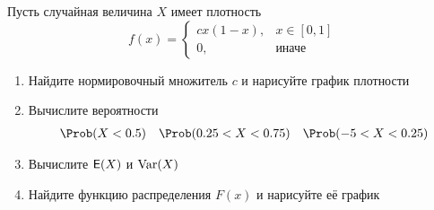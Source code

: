 \begin{exercise}
Пусть случайная величина \(X\) имеет плотность
\[
	f(x)=\begin{cases}
	cx(1-x), & x\in[0,1] \\ 0, & \text{иначе}
	\end{cases}
\]
\begin{enumerate}
	\item Найдите нормировочный множитель \(c\) и нарисуйте график плотности
	\item Вычислите вероятности
	\begin{align*}
		\Prob&(X<0.5) & \Prob&(0.25<X<0.75) & \Prob(-5<X<0.25)
	\end{align*}
	\item Вычислите \({\mathsf E}(X)\) и \(\operatorname{Var}(X)\)
	\item Найдите функцию распределения \(F(x)\) и нарисуйте её график
\end{enumerate}
\end{exercise}